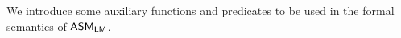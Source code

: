 
We introduce some auxiliary functions and predicates to be used in the formal semantics of $\textsf{ASM}_\textsf{LM}$.

	
